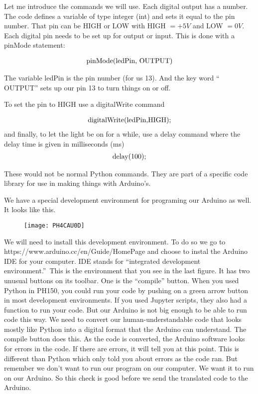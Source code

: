 Let me introduce the commands we will use. Each digital output has a number. The code defines a variable of type integer (int) and sets it equal to the pin number. That pin can be HIGH or LOW with HIGH $=+5\unit{V}$ and LOW $=0\unit{V}$. Each digital pin needs to be set up for output or input. This is done with a pinMode statement:

\begin{equation*}
	\begin{tabular}{l}
		pinMode(ledPin, OUTPUT)
	\end{tabular}
\end{equation*}

The variable ledPin is the pin number (for us 13). And the key word `` OUTPUT'' sets up our pin 13 to turn things on or off.

To set the pin to HIGH use a digitalWrite command

\begin{equation*}
	\begin{tabular}{l}
		digitalWrite(ledPin,HIGH);
	\end{tabular}
\end{equation*}
and finally, to let the light be on for a while, use a delay command where
the delay time is given in milliseconds (ms)%
\begin{equation*}
	\begin{tabular}{l}
		delay(100);
	\end{tabular}
\end{equation*}

These would not be normal Python commands. They are part of a specific code library for use in making things with Arduino's.

We have a special development environment for programing our Arduino as well. It looks like this. 

\begin{figure}[h!]
	\centering
	\texttt{[image: PH4CAU0D]}
\end{figure}

We will need to install this development environment. To do so we go to https://www.arduino.cc/en/Guide/HomePage and choose to instal the Arduino IDE for your computer. IDE stands for \textquotedblleft integrated development environment.\textquotedblright\ This is the environment that you see in the last figure. It has two unusual buttons on its toolbar. One is the ``compile'' button. When you used Python in PH150, you could run your code by pushing on a green arrow button in most development environments. If you used Jupyter scripts, they also had a function to run your code. But our Arduino is not big enough to be able to run code this way. We need to convert our human-understandable code that looks mostly like Python into a digital format that the Arduino can understand. The compile button does this. As the code is converted, the Arduino software looks for errors in the code. If there are errors, it will tell you at this point. This is different than Python which only told you about errors as the code ran. But remember we don't want to run our program on our computer. We want it to run on our Arduino. So this check is good before we send the translated code to the Arduino.

